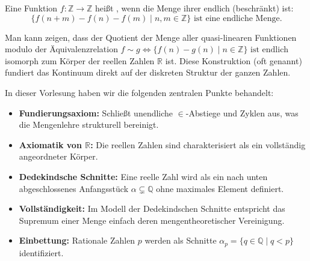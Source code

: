 \begin{math-stroke}
\begin{definition}\label{def:quasi-linear}
Eine Funktion $f \colon \mathbb{Z} \to \mathbb{Z}$ heißt , wenn die Menge ihrer  endlich (beschränkt) ist:
\[ \{ f(n+m) - f(n) - f(m) \mid n, m \in \mathbb{Z} \} \text{ ist eine endliche Menge.} \]
\end{definition}

\begin{explanation-of-steps}
Man kann zeigen, dass der Quotient der Menge aller quasi-linearen Funktionen modulo der Äquivalenzrelation $f \sim g \iff \{f(n) - g(n) \mid n \in \mathbb{Z}\} \text{ ist endlich}$ isomorph zum Körper der reellen Zahlen $\mathbb{R}$ ist. Diese Konstruktion (oft  genannt) fundiert das Kontinuum direkt auf der diskreten Struktur der ganzen Zahlen.
\end{explanation-of-steps}
\end{math-stroke}

\begin{nice-box}
In dieser Vorlesung haben wir die folgenden zentralen Punkte behandelt:
\begin{itemize}
    \item \textbf{Fundierungsaxiom:} Schließt unendliche $\in$-Abstiege und Zyklen aus, was die Mengenlehre strukturell bereinigt.
    \item \textbf{Axiomatik von $\mathbb{R}$:} Die reellen Zahlen sind charakterisiert als ein vollständig angeordneter Körper.
    \item \textbf{Dedekindsche Schnitte:} Eine reelle Zahl wird als ein nach unten abgeschlossenes Anfangsstück $\alpha \subsetneq \mathbb{Q}$ ohne maximales Element definiert.
    \item \textbf{Vollständigkeit:} Im Modell der Dedekindschen Schnitte entspricht das Supremum einer Menge einfach deren mengentheoretischer Vereinigung.
    \item \textbf{Einbettung:} Rationale Zahlen $p$ werden als Schnitte $\alpha_p = \{q \in \mathbb{Q} \mid q < p\}$ identifiziert.
\end{itemize}
\end{nice-box}